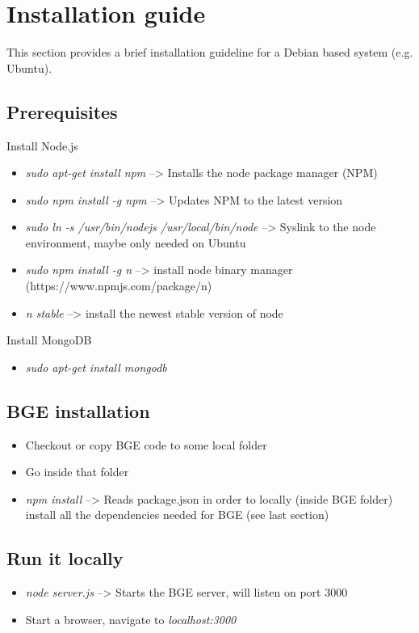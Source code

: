 \section{Installation guide}
\label{sec:imp:installation}

This section provides a brief installation guideline for a Debian based system (e.g. Ubuntu). 

\subsection{Prerequisites}
Install Node.js
\begin{itemize}
    \item \textit{sudo apt-get install npm} --> Installs the node package manager (NPM)
    \item \textit{sudo npm install -g npm} --> Updates NPM to the latest version
    \item \textit{sudo ln -s /usr/bin/nodejs /usr/local/bin/node} --> Syslink to the node environment, maybe only needed on Ubuntu
    \item \textit{sudo npm install -g n} --> install node binary manager \newline (https://www.npmjs.com/package/n)
    \item \textit{n stable} --> install the newest stable version of node
\end{itemize}
Install MongoDB
\begin{itemize}
    \item \textit{sudo apt-get install mongodb}
\end{itemize}

\subsection{BGE installation}

\begin{itemize}
    \item Checkout or copy BGE code to some local folder
    \item Go inside that folder
    \item \textit{npm install} --> Reads package.json in order to locally (inside BGE folder) install all the dependencies needed for BGE (see last section)
\end{itemize}

\subsection{Run it locally}
\begin{itemize}
    \item \textit{node server.js} --> Starts the BGE server, will listen on port 3000
    \item Start a browser, navigate to \textit{localhost:3000}
\end{itemize}
